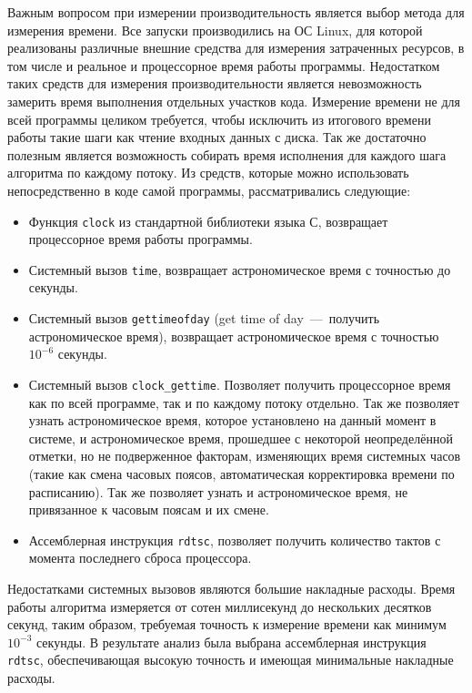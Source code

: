 \documentclass[a4paper,12pt]{extarticle}
\begin{document}
Важным вопросом при измерении производительность является выбор метода для измерения времени.
Все запуски производились на ОС Linux, для которой реализованы различные внешние средства для измерения затраченных ресурсов, в том числе и реальное и процессорное время работы программы. 
Недостатком таких средств для измерения производительности является невозможность замерить время выполнения отдельных участков кода.
Измерение времени  не для всей программы целиком требуется, чтобы исключить из итогового времени работы такие шаги как чтение входных данных с диска. 
Так же достаточно полезным является возможность собирать время исполнения для каждого шага алгоритма по каждому потоку.
Из средств, которые можно использовать непосредственно в коде самой программы, рассматривались следующие:
\begin{itemize}
    \item Функция \texttt{clock} из стандартной библиотеки языка С, возвращает процессорное время работы программы. 
    \item Системный вызов \texttt{time}, возвращает астрономическое время с точностью до секунды. 
    \item Системный вызов \texttt{gettimeofday} (get time of day~---~получить астрономическое время), возвращает астрономическое время с точностью $10^{-6}$ секунды.
    \item Системный вызов \texttt{clock\_gettime}. Позволяет получить процессорное время как по всей программе, так и по каждому потоку отдельно. 
    Так же позволяет узнать астрономическое время, которое установлено на данный момент в системе, и астрономическое время, прошедшее с некоторой неопределённой отметки, но не подверженное факторам, изменяющих время системных часов (такие как смена часовых поясов, автоматическая корректировка времени по расписанию).
    Так же позволяет узнать и астрономическое время, не привязанное к часовым поясам и их смене.
    \item Ассемблерная инструкция \texttt{rdtsc}, позволяет получить количество тактов с момента последнего сброса процессора.
\end{itemize}
Недостатками системных вызовов являются большие накладные расходы. Время работы алгоритма измеряется от сотен миллисекунд до нескольких десятков секунд, таким образом, требуемая точность к измерение времени как минимум $10^{-3}$ секунды.
В результате анализ была выбрана ассемблерная инструкция \texttt{rdtsc}, обеспечивающая высокую точность и имеющая минимальные накладные расходы.
\end{document}
